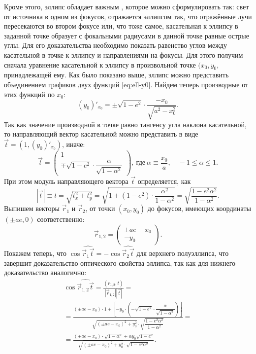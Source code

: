 Кроме этого, эллипс обладает важным , которое можно сформулировать так: свет от источника в одном из фокусов, отражается эллипсом так, что отражённые лучи пересекаются во втором фокусе или, что тоже самое, касательная к эллипсу в заданной точке образует с фокальными радиусами в данной точке равные острые углы. Для его доказательства необходимо показать равенство углов между касательной в точке к эллипсу и направлениями на фокусы. Для этого получим сначала уравнение касательной к эллипсу в произвольной точке $(x_0, y_0$, принадлежащей ему. Как было показано выше, эллипс можно представить объединением графиков двух функций \eqref{eq:ell-y0}. Найдем теперь производные от этих функций по $x_0$:
\begin{equation*}
	(y_0)'_{x_0} = \pm \sqrt{1 - e^2} \cdot \frac{-x_0}{\sqrt{a^2 - x_0^2}}.
\end{equation*}
Так как значение производной в точке равно тангенсу угла наклона касательной, то направляющий вектор касательной можно представить в виде $\vec{t} = \left(1,  (y_0)'_{x_0}\right)$, иначе:
\begin{equation*}
	\vec t =
	\begin{pmatrix}
		1\\
		\mp \sqrt{1 - e^2} \cdot \dfrac{\alpha}{\sqrt{1 - \alpha^2}}
	\end{pmatrix},~\text{где}~ \alpha \equiv \frac{x_0}{a},\quad -1 \leqslant \alpha \leqslant 1.
\end{equation*}
При этом модуль направляющего вектора $\vec t$ определяется, как
\begin{equation*}
	|\vec t| \equiv t = \sqrt{t_x^2 + t_y^2} = \sqrt{1 + (1 - e^2) \cdot \frac{\alpha^2}{1 - \alpha^2}} = \sqrt{\frac{1 - e^2 \alpha^2}{1 - \alpha^2}}.
\end{equation*}
Выпишем векторы $\vec r_1$ и $\vec r_2$, от точки $(x_0, y_0)$ до фокусов, имеющих координаты $(\pm ae, 0)$ соответственно:
\begin{equation*}
	\vec r_{1,2} =
	\begin{pmatrix}
		\pm ae - x_0\\
		-y_0
	\end{pmatrix}.
\end{equation*}
Покажем теперь, что $\cos \widehat{\vec r_1 \vec t} = - \cos \widehat{\vec r_2 \vec t}$ для верхнего полуэллипса, что завершит доказательство оптического свойства эллипса, так как для нижнего доказательство аналогично:
\begin{multline*}
	\cos \widehat{\vec r_{1, 2}  \vec t}
	= \frac{(r_{1, 2}, t)}{|\vec r_{1, 2}| | \vec t|} = \\
	= \frac{(\pm ae - x_0) \cdot 1 + \left[ -y_0 \cdot \left(- \sqrt{1 - e^2} \cdot \dfrac{\alpha}{\sqrt{1 - \alpha^2}} \right) \right]}{\sqrt{(\pm ae - x_0)^2 + y_0^2} \cdot \sqrt{\dfrac{1 - e^2 \alpha^2}{1 - \alpha^2}}} =\\
	= \frac{(\pm ae - x_0) \cdot \sqrt{1 - \alpha^2} + \alpha y_0\sqrt{1 - e^2}}{\sqrt{(\pm ae - x_0)^2 + y_0^2} \cdot \sqrt{1 - e^2 \alpha^2}}.
\end{multline*}

